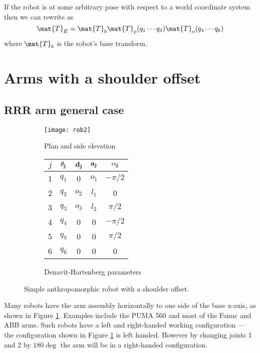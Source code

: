 \documentclass[11pt]{article}
\numberwithin{equation}{section}
\begin{document}
If the robot is at some arbitrary pose with respect to a world coordinate system then we can rewrite  as
\[
\mat{T}_E = \mat{T}_b \mat{T}_p(q_1 \cdots q_3) \mat{T}_o(q_4 \cdots q_6) 
\]
where $\mat{T}_b$ is the robot's base transform.

\pagebreak
\section{Arms with a shoulder offset}
\subsection{RRR arm general case}

	\begin{figure}[h]
	\centering
	\begin{subfigure}[b]{0.6\textwidth}
		\texttt{[image: rob2]}
		\caption{Plan and side elevation}
		\label{fig:rob2}
	\end{subfigure}
	\begin{subfigure}[b]{0.3\textwidth}
		\begin{tabular}{|c|c|c|c|c|} \hline
			$j$ & $\bf \theta_j$ & $\bf d_j$ & $\bf a_j$ & $\bf \alpha_j$ \\ \hline
			\rowcolor{SkyBlue}1 &  $q_1$ & \cellcolor{White} 0 &  $o_1$& $-\pi/2$ \\
			\rowcolor{SkyBlue}2 & $q_2$ & $o_2$ & $l_1$& 0 \\
			\rowcolor{SkyBlue}3 &  $q_3$ & $o_3$ &$l_2$  & $\pi/2$ \\
			\rowcolor{Peach}4 & $q_4$ & 0 & 0 & $-\pi/2$ \\
			\rowcolor{Peach}5 &  $q_5$ & 0 & 0 & $\pi/2$ \\
			\cellcolor{Peach} 6 & \cellcolor{Peach} $q_6$ & 0 &0  & 0 \\ \hline
		\end{tabular}
		\caption{Denavit-Hartenberg parameters}
		\label{fig:dh2}
	\end{subfigure}
	\caption{Simple anthropomorphic robot with a shoulder offset.}
	\end{figure}


Many robots have the arm assembly horizontally to one side of the base x-axis, as shown in Figure \ref{fig:rob2}.  
Examples include the PUMA 560 and most of
the Fanuc and ABB arms.
Such robots have a left and right-handed working configuration\cite[Sec~7.4.4]{Corke11a} --- the configuration shown in Figure \ref{fig:rob2} is left handed.  However by
changing joints 1 and 2 by $180\deg$ the arm will be in a right-handed configuration.
\end{document}
